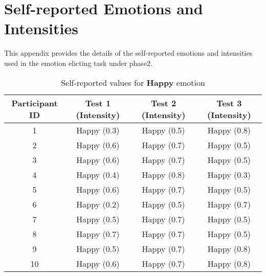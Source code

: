 

\section*{Self-reported Emotions and Intensities}\label{app:a}
This appendix provides the details of the self-reported emotions and intensities used in the emotion elicting task under phase2.


\begin{table}[H]
    \centering
    \caption{Self-reported values for \textbf{Happy} emotion}
    \label{tab:happy-self-report}
    \begin{tabular}{|c|c|c|c|}
    \hline
    \textbf{Participant ID} & \textbf{Test 1 (Intensity)} & \textbf{Test 2 (Intensity)} & \textbf{Test 3 (Intensity)} \\
    \hline
    1 & Happy (0.3) & Happy (0.5) & Happy (0.8) \\
    2 & Happy (0.6) & Happy (0.7) & Happy (0.5) \\
    3 & Happy (0.6) & Happy (0.7) & Happy (0.5) \\
    4 & Happy (0.4) & Happy (0.8) & Happy (0.3) \\
    5 & Happy (0.6) & Happy (0.7) & Happy (0.5) \\
    6 & Happy (0.2) & Happy (0.5) & Happy (0.7) \\
    7 & Happy (0.5) & Happy (0.7) & Happy (0.5) \\
    8 & Happy (0.7) & Happy (0.7) & Happy (0.5) \\
    9 & Happy (0.5) & Happy (0.7) & Happy (0.8) \\
    10 & Happy (0.6) & Happy (0.7) & Happy (0.8) \\
    \hline
    \end{tabular}
    \end{table}
    

